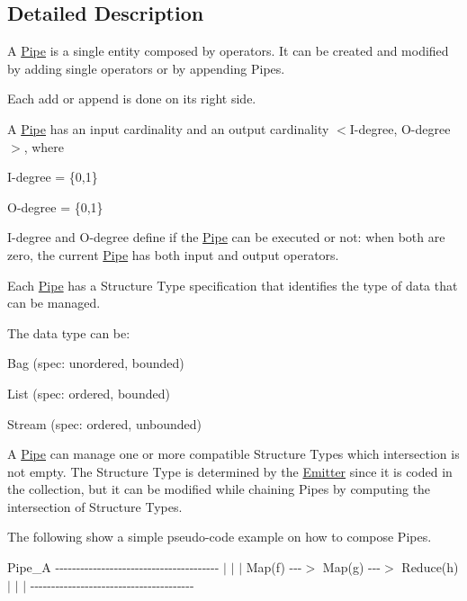 \subsection{\-Detailed \-Description}
\-A \hyperlink{class_pipe}{\-Pipe} is a single entity composed by operators. \-It can be created and modified by adding single operators or by appending \-Pipes.

\-Each add or append is done on its right side.

\-A \hyperlink{class_pipe}{\-Pipe} has an input cardinality and an output cardinality $<$\-I-\/degree, \-O-\/degree$>$, where
\begin{DoxyItemize}
\item \-I-\/degree = \{0,1\}
\item \-O-\/degree = \{0,1\}
\end{DoxyItemize}

\-I-\/degree and \-O-\/degree define if the \hyperlink{class_pipe}{\-Pipe} can be executed or not\-: when both are zero, the current \hyperlink{class_pipe}{\-Pipe} has both input and output operators.

\-Each \hyperlink{class_pipe}{\-Pipe} has a \-Structure \-Type specification that identifies the type of data that can be managed.

\-The data type can be\-:
\begin{DoxyItemize}
\item \-Bag (spec\-: unordered, bounded)
\item \-List (spec\-: ordered, bounded)
\item \-Stream (spec\-: ordered, unbounded)
\end{DoxyItemize}

\-A \hyperlink{class_pipe}{\-Pipe} can manage one or more compatible \-Structure \-Types which intersection is not empty. \-The \-Structure \-Type is determined by the \hyperlink{class_emitter}{\-Emitter} since it is coded in the collection, but it can be modified while chaining \-Pipes by computing the intersection of \-Structure \-Types.

\-The following show a simple pseudo-\/code example on how to compose \-Pipes.

\-Pipe\-\_\-\-A -\/-\/-\/-\/-\/-\/-\/-\/-\/-\/-\/-\/-\/-\/-\/-\/-\/-\/-\/-\/-\/-\/-\/-\/-\/-\/-\/-\/-\/-\/-\/-\/-\/-\/-\/-\/-\/-\/-\/ $|$ $|$ $|$ \-Map(f) -\/-\/-\/$>$ \-Map(g) -\/-\/-\/$>$ \-Reduce(h) $|$ $|$ $|$ -\/-\/-\/-\/-\/-\/-\/-\/-\/-\/-\/-\/-\/-\/-\/-\/-\/-\/-\/-\/-\/-\/-\/-\/-\/-\/-\/-\/-\/-\/-\/-\/-\/-\/-\/-\/-\/-\/-\/

